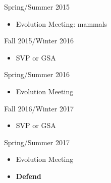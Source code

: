 \documentclass[12pt,letterpaper]{article}
\begin{document}
Spring/Summer 2015
\begin{itemize}
  \item Evolution Meeting: mammals
\end{itemize}

Fall 2015/Winter 2016
\begin{itemize}
  \item SVP or GSA
\end{itemize}

Spring/Summer 2016
\begin{itemize}
  \item Evolution Meeting
\end{itemize}

Fall 2016/Winter 2017
\begin{itemize}
  \item SVP or GSA
\end{itemize}

Spring/Summer 2017
\begin{itemize}
  \item Evolution Meeting
  \item \textbf{Defend}
\end{itemize}



\clearpage


\end{document}
